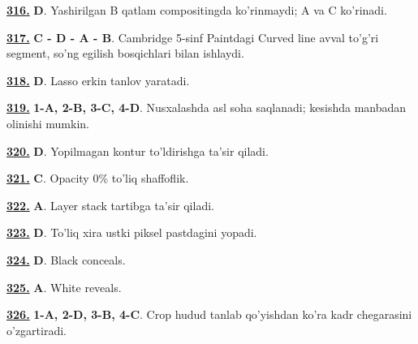 \documentclass[10pt,a4paper,oneside]{article}
\begin{document}
\par\vspace{3mm}
\noindent\hyperlink{q316}{\textbf{316.}} \textbf{D}.  Yashirilgan B qatlam compositingda ko'rinmaydi; A va C ko'rinadi.
\par\vspace{3mm}
\noindent\hyperlink{q317}{\textbf{317.}} \textbf{C - D - A - B}.  Cambridge 5-sinf Paintdagi Curved line avval to'g'ri segment, so'ng egilish bosqichlari bilan ishlaydi.
\par\vspace{3mm}
\noindent\hyperlink{q318}{\textbf{318.}} \textbf{D}.  Lasso erkin tanlov yaratadi.
\par\vspace{3mm}
\noindent\hyperlink{q319}{\textbf{319.}} \textbf{1-A, 2-B, 3-C, 4-D}.  Nusxalashda asl soha saqlanadi; kesishda manbadan olinishi mumkin.
\par\vspace{3mm}
\noindent\hyperlink{q320}{\textbf{320.}} \textbf{D}.  Yopilmagan kontur to'ldirishga ta'sir qiladi.
\par\vspace{3mm}
\noindent\hyperlink{q321}{\textbf{321.}} \textbf{C}.  Opacity 0\% to'liq shaffoflik.
\par\vspace{3mm}
\noindent\hyperlink{q322}{\textbf{322.}} \textbf{A}.  Layer stack tartibga ta'sir qiladi.
\par\vspace{3mm}
\noindent\hyperlink{q323}{\textbf{323.}} \textbf{D}.  To'liq xira ustki piksel pastdagini yopadi.
\par\vspace{3mm}
\noindent\hyperlink{q324}{\textbf{324.}} \textbf{D}.  Black conceals.
\par\vspace{3mm}
\noindent\hyperlink{q325}{\textbf{325.}} \textbf{A}.  White reveals.
\par\vspace{3mm}
\noindent\hyperlink{q326}{\textbf{326.}} \textbf{1-A, 2-D, 3-B, 4-C}.  Crop hudud tanlab qo'yishdan ko'ra kadr chegarasini o'zgartiradi.
\par\vspace{3mm}
\end{document}
